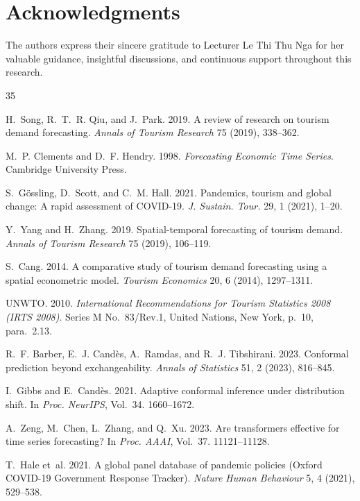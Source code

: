 \documentclass[sigconf]{acmart}
\begin{document}
\section*{Acknowledgments}
The authors express their sincere gratitude to Lecturer Le Thi Thu Nga for her valuable guidance, insightful discussions, and continuous support throughout this research.

\begingroup
\renewcommand{\bibfont}{\scriptsize}
\setlength{\bibsep}{0pt}
\begin{thebibliography}{35}

H.~Song, R.~T.~R. Qiu, and J.~Park. 2019. A review of research on tourism demand forecasting. \emph{Annals of Tourism Research} 75 (2019), 338--362.

M.~P. Clements and D.~F. Hendry. 1998. \emph{Forecasting Economic Time Series}. Cambridge University Press.

S.~G{\"o}ssling, D.~Scott, and C.~M. Hall. 2021. Pandemics, tourism and global change: A rapid assessment of COVID-19. \emph{J. Sustain. Tour.} 29, 1 (2021), 1--20.

Y.~Yang and H.~Zhang. 2019. Spatial-temporal forecasting of tourism demand. \emph{Annals of Tourism Research} 75 (2019), 106--119.

S.~Cang. 2014. A comparative study of tourism demand forecasting using a spatial econometric model. \emph{Tourism Economics} 20, 6 (2014), 1297--1311.

UNWTO. 2010. \emph{International Recommendations for Tourism Statistics 2008 (IRTS 2008)}. Series M No.~83/Rev.1, United Nations, New York, p.~10, para.~2.13.

R.~F. Barber, E.~J. Cand{\`e}s, A.~Ramdas, and R.~J. Tibshirani. 2023. Conformal prediction beyond exchangeability. \emph{Annals of Statistics} 51, 2 (2023), 816--845.

I.~Gibbs and E.~Cand{\`e}s. 2021. Adaptive conformal inference under distribution shift. In \emph{Proc. NeurIPS}, Vol.~34. 1660--1672.

A.~Zeng, M.~Chen, L.~Zhang, and Q.~Xu. 2023. Are transformers effective for time series forecasting? In \emph{Proc. AAAI}, Vol.~37. 11121--11128.

T.~Hale et~al. 2021. A global panel database of pandemic policies (Oxford COVID-19 Government Response Tracker). \emph{Nature Human Behaviour} 5, 4 (2021), 529--538.


\end{thebibliography}
\end{document}
